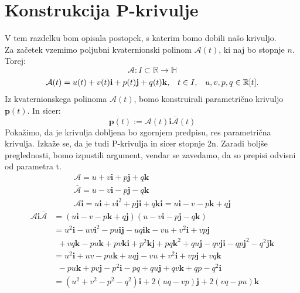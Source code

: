 \documentclass[mat1]{fmfdelo}
\newcommand{\R}{\mathbb R}
\newcommand{\HH}{\mathbb H}
\newcommand{\ii}{\boldsymbol i}
\newcommand{\jj}{\boldsymbol j}
\newcommand{\kk}{\boldsymbol k}
\begin{document}
\section{Konstrukcija P-krivulje}
V tem razdelku bom opisala postopek, s katerim bomo dobili našo krivuljo.\\
Za začetek vzemimo poljubni kvaternionski polinom $\mathcal{A}(t)$, ki naj bo stopnje $n$. Torej:
\begin{equation*}
\mathcal{A}: I \subset \R \rightarrow \HH
\end{equation*}
\begin{equation*}
\begin{array}{c c c}
\mathcal{A}(t) = u(t) + v(t) \mathbf{i} + p(t) \mathbf{j} + q(t) \mathbf{k}, & t \in I,& u,v,p,q \in \R[t].
\end{array}
\end{equation*}
Iz kvaternionskega polinoma $\mathcal{A}(t)$, bomo konstruirali parametrično krivuljo $\mathbf{p}(t)$. In sicer:
\begin{equation}
\boldsymbol{p}(t) := \mathcal{A}(t) \boldsymbol{i} \overline{\mathcal{A}}(t)
\end{equation}
Pokažimo, da je krivulja dobljena bo zgornjem predpisu, res parametrična krivulja. Izkaže se, da je tudi P-krivulja in sicer stopnje 2n. Zaradi boljše preglednosti, bomo izpustili argument, vendar se zavedamo, da so prepisi odvisni od parametra t.
\begin{equation*}
\begin{array}{c}
\mathcal{A} = u + v\boldsymbol{i} + p \boldsymbol{j} + q \boldsymbol{k}  \\
\overline{\mathcal{A}} = u - v\boldsymbol{i} - p \boldsymbol{j} - q \boldsymbol{k}  \\
\mathcal{A} \boldsymbol{i} = u \boldsymbol{i} + v \boldsymbol{i}^2 + p \boldsymbol{ji} + q\boldsymbol{ki} =  u \boldsymbol{i} - v - p \boldsymbol{k} + q\boldsymbol{j}	
\end{array} 
\end{equation*}
\begin{equation*}
\begin{split}
\mathcal{A}\boldsymbol{i}\overline{\mathcal{A}} & =(u\boldsymbol{i}-v-p\boldsymbol{k}+q\boldsymbol{j})(u-v\boldsymbol{i}-p\boldsymbol{j}-q\boldsymbol{k}) \\
&= u^2 \ii -uv\ii^2-pu\ii\jj - uq\ii\kk - vu + v^2\ii + vp\jj\\
&~~ +vq\kk - pu\kk + pv\kk\ii + p^2 \kk\jj + pq\kk^2 + qu\jj - qv\jj\ii - qp\jj^2 -q^2\jj\kk \\
& = u^2\ii + uv - pu\kk + uq\jj -vu+v^2\ii +vp\jj + vq\kk \\
& ~~-pu\kk+pv\jj-p^2\ii-pq+qu\jj+qv\kk+qp-q^2\ii \\
& = (u^2+v^2-p^2-q^2)\ii + 2(uq-vp)\jj +2(vq-pu)\kk
\end{split}
\end{equation*}
\end{document}
